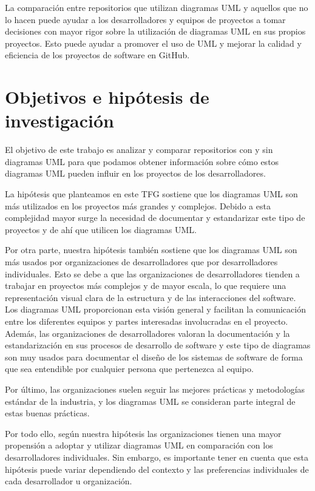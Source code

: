 \documentclass[a4paper, 12pt]{book}
\begin{document}
La comparación entre repositorios que utilizan diagramas UML y aquellos que no lo hacen puede ayudar a los desarrolladores y equipos de proyectos a tomar decisiones con mayor rigor sobre la utilización de diagramas UML en sus propios proyectos.
Esto puede ayudar a promover el uso de UML y mejorar la calidad y eficiencia de los proyectos de software en GitHub.


\section{Objetivos e hipótesis de investigación} %
\label{sec:bbjetivos e hipótesis de investigación} %


El objetivo de este trabajo es analizar y comparar repositorios con y sin diagramas UML para que podamos obtener información sobre cómo estos diagramas UML pueden influir en los proyectos de los desarrolladores. 


La hipótesis que planteamos en este TFG sostiene que los diagramas UML son más utilizados en los proyectos más grandes y complejos.
Debido a esta complejidad mayor surge la necesidad de documentar y estandarizar este tipo de proyectos y de ahí que utilicen los diagramas UML.


Por otra parte, nuestra hipótesis también sostiene que los diagramas UML son más usados por organizaciones de desarrolladores que por desarrolladores individuales.
Esto se debe a que las organizaciones de desarrolladores tienden a trabajar en proyectos más complejos y de mayor escala, lo que requiere una representación visual clara de la estructura y de las interacciones del software.
Los diagramas UML proporcionan esta visión general y facilitan la comunicación entre los diferentes equipos y partes interesadas involucradas en el proyecto.
Además, las organizaciones de desarrolladores valoran la documentación y la estandarización en sus procesos de desarrollo de software y este tipo de diagramas son muy usados para documentar el diseño de los sistemas de software de forma que sea entendible por cualquier persona que pertenezca al equipo.


Por último, las organizaciones suelen seguir las mejores prácticas y metodologías estándar de la industria, y los diagramas UML se consideran parte integral de estas buenas prácticas. 


Por todo ello, según nuestra hipótesis las organizaciones tienen una mayor propensión a adoptar y utilizar diagramas UML en comparación con los desarrolladores individuales. 
Sin embargo, es importante tener en cuenta que esta hipótesis puede variar dependiendo del contexto y las preferencias individuales de cada desarrollador u organización.
\end{document}
